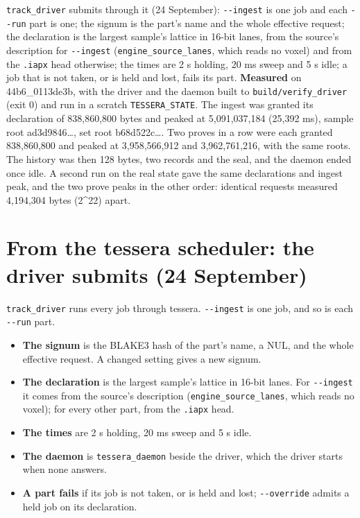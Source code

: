 \texttt{track\_\allowbreak{}driver} submits through it (24 September): \texttt{-\allowbreak{}-\allowbreak{}ingest} is one job and each \texttt{-\allowbreak{}-\allowbreak{}run} part is one; the signum is the part's name and the whole effective request; the declaration is the largest sample's lattice in 16-bit lanes, from the source's description for \texttt{-\allowbreak{}-\allowbreak{}ingest} (\texttt{engine\_\allowbreak{}source\_\allowbreak{}lanes}, which reads no voxel) and from the \texttt{.\allowbreak{}iapx} head otherwise; the times are 2 s holding, 20 ms sweep and 5 s idle; a job that is not taken, or is held and lost, fails its part. \textbf{Measured} on 44b6\_\allowbreak{}0113de3b, with the driver and the daemon built to \texttt{build/\allowbreak{}verify\_\allowbreak{}driver} (exit 0) and run in a scratch \texttt{TESSERA\_\allowbreak{}STATE}. The ingest was granted its declaration of 838,860,800 bytes and peaked at 5,091,037,184 (25,392 ms), sample root ad3d9846…, set root b68d522c…. Two proves in a row were each granted 838,860,800 and peaked at 3,958,566,912 and 3,962,761,216, with the same roots. The history was then 128 bytes, two records and the seal, and the daemon ended once idle. A second run on the real state gave the same declarations and ingest peak, and the two prove peaks in the other order: identical requests measured 4,194,304 bytes (2\textasciicircum{}22) apart.

\section{\texorpdfstring{From the tessera scheduler: the driver submits (24 September)}{From the tessera scheduler: the driver submits (24 September)}}

\texttt{track\_\allowbreak{}driver} runs every job through tessera. \texttt{-\allowbreak{}-\allowbreak{}ingest} is one job, and so is each \texttt{-\allowbreak{}-\allowbreak{}run} part.

\begin{itemize}
\item \textbf{The signum} is the BLAKE3 hash of the part's name, a NUL, and the whole effective request. A changed setting gives a new signum.
\item \textbf{The declaration} is the largest sample's lattice in 16-bit lanes. For \texttt{-\allowbreak{}-\allowbreak{}ingest} it comes from the source's description (\texttt{engine\_\allowbreak{}source\_\allowbreak{}lanes}, which reads no voxel); for every other part, from the \texttt{.\allowbreak{}iapx} head.
\item \textbf{The times} are 2 s holding, 20 ms sweep and 5 s idle.
\item \textbf{The daemon} is \texttt{tessera\_\allowbreak{}daemon} beside the driver, which the driver starts when none answers.
\item \textbf{A part fails} if its job is not taken, or is held and lost; \texttt{-\allowbreak{}-\allowbreak{}override} admits a held job on its declaration.
\end{itemize}


